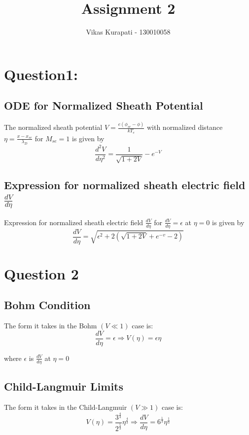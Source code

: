 \documentclass[11pt, a4paper]{article}
\title{\textbf{Assignment 2}}
\author{Vikas Kurapati - 130010058}
\begin{document}
\maketitle
\newpage
\section{Question1:}
\subsection{ODE for Normalized Sheath Potential}
The normalized sheath potential $V = \frac{e(\phi_{se} - \phi)}{k T_e}$ with normalized distance $\eta = \frac{x - x_{se}}{\lambda_D}$ for $M_{se} = 1$ is given by
\begin{equation}
 \frac{d^2 V}{d\eta^2} = \frac{1}{\sqrt{1 + 2V}} - e^{-V}
\end{equation}

\subsection{Expression for normalized sheath electric field \textbf{$\frac{dV}{d\eta}$}}
Expression for normalized sheath electric field $\frac{dV}{d\eta}$ for $\frac{dV}{d\eta} = \epsilon$ at $\eta = 0$ is given by
\begin{equation}
 \frac{dV}{d\eta} = \sqrt{\epsilon^2 + 2(\sqrt{1 + 2V} + e^{-v} -2)}
\end{equation}

\section{Question 2}
\subsection{Bohm Condition}
The form it takes in the Bohm $(V\ll1)$ case is:
\begin{equation}
 \frac{dV}{d\eta} = \epsilon \Rightarrow V(\eta) = \epsilon \eta
\end{equation}

where $\epsilon$ is $\frac{dV}{d\eta}$ at $\eta = 0$

\subsection{Child-Langmuir Limits}
The form it takes in the Child-Langmuir $(V\gg1)$ case is:
\begin{equation}
 V(\eta) = \frac{3^{\frac{4}{3}}}{2^\frac{5}{3}} \eta^{\frac{4}{3}} \Rightarrow \frac{dV}{d\eta} = 6^\frac{1}{3} \eta^\frac{1}{3}
\end{equation}
\end{document}
